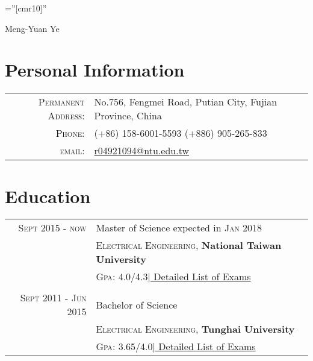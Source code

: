 \documentclass[a4paper,10pt]{article}
\begin{document}

\pagestyle{empty} %

\font\fb=''[cmr10]'' %

\par{\centering
		{\Huge Meng-Yuan Ye
	}\bigskip\par}

\section{Personal Information}

\begin{tabular}{rl}
    \textsc{Permanent Address:} & No.756, Fengmei Road, Putian City, Fujian Province, China \\
    \textsc{Phone:}     & (+86) 158-6001-5593 (+886) 905-265-833 \\
    \textsc{email:}     & \href{mailto:r04921094@ntu.edu.tw}{r04921094@ntu.edu.tw}
\end{tabular}

\section{Education}
\begin{tabular}{r|p{10.3cm}}
 \textsc{Sept 2015 - now} & Master of Science expected in \textsc{Jan 2018}\\
& \textsc{Electrical Engineering}, \textbf{National Taiwan University}\\
&\normalsize \textsc{Gpa}: 4.0/4.3\href{run:graduate school transcript.pdf}{\hfill | \footnotesize Detailed List of Exams}\\\multicolumn{2}{c}{} \\

\textsc{Sept 2011 - Jun 2015} & Bachelor of Science\\
& \textsc{Electrical Engineering}, \textbf{Tunghai University}\\
&\normalsize \textsc{Gpa}: 3.65/4.0\href{run:colledge transcript.pdf}{\hfill| \footnotesize Detailed List of Exams}\\
\end{tabular}
\end{document}
